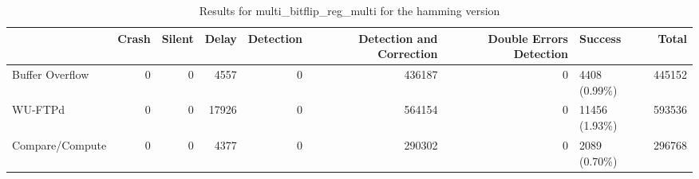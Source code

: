 \begin{table}[t]
	\centering
	\caption{Results for multi_bitflip_reg_multi for the hamming version}
	\label{table:end_sim_by_status_hamming_3_multi_bitflip_reg_multi}
	\begin{tabular}{lrrrrrrlr}
		\toprule
		                & Crash & Silent & Delay & Detection & Detection and Correction & Double Errors Detection & Success        & Total  \\
		\midrule
		Buffer Overflow & 0     & 0      & 4557  & 0         & 436187                   & 0                       & 4408 (0.99\%)  & 445152 \\
		WU-FTPd         & 0     & 0      & 17926 & 0         & 564154                   & 0                       & 11456 (1.93\%) & 593536 \\
		Compare/Compute & 0     & 0      & 4377  & 0         & 290302                   & 0                       & 2089 (0.70\%)  & 296768 \\
		\bottomrule
	\end{tabular}
\end{table}
